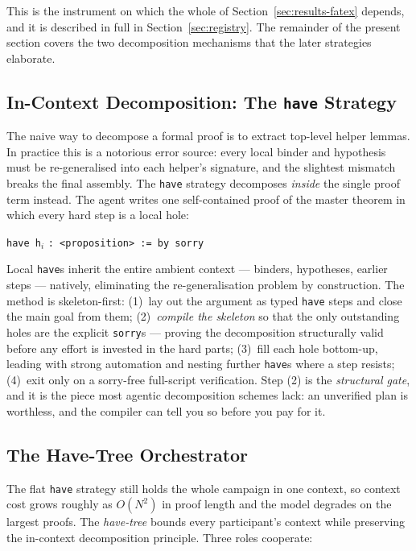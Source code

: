 \documentclass[12pt, a4paper]{article}
\begin{document}
This is the instrument on which the whole of
Section~\ref{sec:results-fatex} depends, and it is described in full in
Section~\ref{sec:registry}. The remainder of the present section covers the
two decomposition mechanisms that the later strategies elaborate.

\subsection{In-Context Decomposition: The \texttt{have} Strategy}
\label{sec:have}

The naive way to decompose a formal proof is to extract top-level helper
lemmas. In practice this is a notorious error source: every local binder and
hypothesis must be re-generalised into each helper's signature, and the
slightest mismatch breaks the final assembly. The \texttt{have} strategy
decomposes \emph{inside} the single proof term instead. The agent writes one
self-contained proof of the master theorem in which every hard step is a
local hole:

\begin{center}
  \texttt{have h}$_i$ \texttt{: <proposition> := by sorry}
\end{center}

Local \texttt{have}s inherit the entire ambient context --- binders,
hypotheses, earlier steps --- natively, eliminating the re-generalisation
problem by construction. The method is skeleton-first: (1)~lay out the
argument as typed \texttt{have} steps and close the main goal from them;
(2)~\emph{compile the skeleton} so that the only outstanding holes are the
explicit \texttt{sorry}s --- proving the decomposition structurally valid
before any effort is invested in the hard parts; (3)~fill each hole
bottom-up, leading with strong automation and nesting further \texttt{have}s
where a step resists; (4)~exit only on a sorry-free full-script
verification. Step (2) is the \emph{structural gate}, and it is the piece
most agentic decomposition schemes lack: an unverified plan is worthless,
and the compiler can tell you so before you pay for it.

\subsection{The Have-Tree Orchestrator}
\label{sec:have-tree}

The flat \texttt{have} strategy still holds the whole campaign in one
context, so context cost grows roughly as $O(N^2)$ in proof length and the
model degrades on the largest proofs. The \emph{have-tree} bounds every
participant's context while preserving the in-context decomposition
principle. Three roles cooperate:
\end{document}
